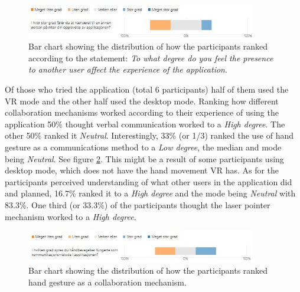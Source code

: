 \begin{figure}[H]
  \centering
   \captionsetup{width=.8\linewidth}
    \includegraphics[width=0.9\textwidth]{fig/phase_3/survey/ValgKompAppPrecence.jpg}
 \caption{Bar chart showing the distribution of how the participants ranked according to the statement: \textit{To what degree do you feel the presence to another user affect the experience of the application}.}
\label{fig:phase3_SurveyPrecenceIncrease}
\end{figure}




Of those who tried the application (total 6 participants) half of them used the VR mode and the other half used the desktop mode. Ranking how different collaboration mechanisms worked according to their experience of using the application 50\% thought verbal communication worked to a \textit{High degree}. The other 50\% ranked it \textit{Neutral}. Interestingly, 33\% (or 1/3) ranked the use of hand gesture as a communications method to a \textit{Low degree}, the median and mode being \textit{Neutral}. See figure \ref{fig:phase3_CollabHandGestures}. This might be a result of some participants using desktop mode, which does not have the hand movement VR has. As for the participants perceived understanding of what other users in the application did and planned, 16.7\% ranked it to a \textit{High degree} and the mode being \textit{Neutral} with 83.3\%. 
One third (or 33.3\%) of the participants thought the laser pointer mechanism worked to a \textit{High degree}. 



\begin{figure}[H]
  \centering
   \captionsetup{width=.8\linewidth}
    \includegraphics[width=0.9\textwidth]{fig/phase_3/survey/CollabMechHandGestures.jpg}
 \caption{Bar chart showing the distribution of how the participants ranked hand gesture as a collaboration mechanism.}
\label{fig:phase3_CollabHandGestures}
\end{figure}


